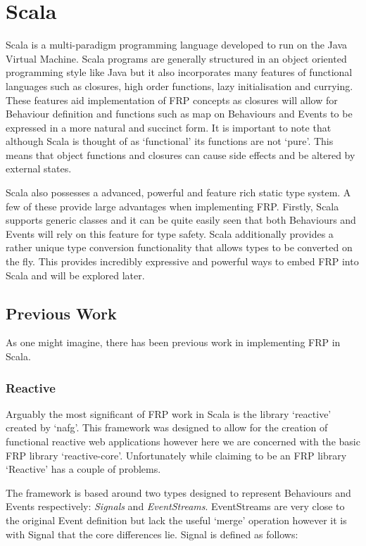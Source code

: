 \chapter{Scala}
  Scala is a multi-paradigm programming language developed to run on the Java Virtual Machine. Scala programs are
  generally structured in an object oriented programming style like Java but it also incorporates many features of
  functional languages such as closures, high order functions, lazy initialisation and currying. These features aid
  implementation of FRP concepts as closures will allow for Behaviour definition and functions such as map on
  Behaviours and Events to be expressed in a more natural and succinct form. It is
  important to note that although Scala is thought of as `functional' its functions are not `pure'. This means
  that object functions and closures can cause side effects and be altered by external states.

  Scala also possesses a advanced, powerful and feature rich static type system. A few of these provide large
  advantages when implementing FRP. Firstly, Scala supports generic classes and it can be quite easily seen
  that both Behaviours and Events will rely on this feature for type safety. Scala additionally provides
  a rather unique type conversion functionality that allows types to be converted on the fly. This provides
  incredibly expressive and powerful ways to embed FRP into Scala and will be explored later.
  
  \section{Previous Work}
    As one might imagine, there has been previous work in implementing FRP in Scala. 
    
    \subsection{Reactive}
      Arguably the most significant of FRP work in Scala is the library `reactive' created by `nafg'. This framework was 
      designed to allow for the creation of functional reactive web applications however here we are concerned with
      the basic FRP library `reactive-core'. Unfortunately while claiming to be an FRP library `Reactive'
      has a couple of problems.
      
      The framework is based around two types designed to represent Behaviours and Events respectively: \emph{Signals}
      and \emph{EventStreams}. EventStreams are very close to the original Event definition but lack the
      useful `merge' operation however it is with Signal that the core differences lie. Signal is defined as follows:
      
